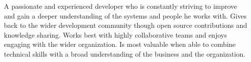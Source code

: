 %
%
%
\par{
A passionate and experienced developer who is constantly striving to improve and gain a deeper understanding of the systems and people he works with. Gives back to the wider development community though open source contributions and knowledge sharing. Works best with highly collaborative teams and enjoys engaging with the wider organization. Is most valuable when able to combine technical skills with a broad understanding of the business and the organization.
}